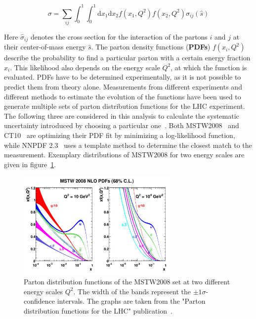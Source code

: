 \begin{equation}
  \label{eq:pdfxs}
  \sigma = \sum_{ij} \int_0^1 \int_0^1 \text{d}x_1 \text{d}x_2 f(x_1, Q^2) f(x_2 ,Q^2) \hat{\sigma}_{ij}(\hat{s})
\end{equation}

Here $\hat{\sigma}_{ij}$ denotes the cross section for the interaction of the partons $i$ and $j$ at their center-of-mass energy $\hat{s}$. The parton density functions (\textbf{PDFs}) $f(x_i, Q^2)$ describe the probability to find a particular parton with a certain energy fraction $x_i$. This likelihood also depends on the energy scale $Q^2$, at which the function is evaluated. PDFs have to be determined experimentally, as it is not possible to predict them from theory alone. Measurements from different experiments and different methods to estimate the evolution of the functions have been used to generate multiple sets of parton distribution functions for the LHC experiment. The following three are considered in this analysis to calculate the systematic uncertainty introduced by choosing a particular one~\cite{pdfforlhc}. Both \textsc{MSTW2008}~\cite{mstw2008,mstw2008as} and \textsc{CT10}~\cite{ct10} are optimizing their PDF fit by minimizing a log-likelihood function, while \textsc{NNPDF 2.3}~\cite{nnpdf23,nnpdf23as} uses a template method to determine the closest match to the measurement. Exemplary distributions of \textsc{MSTW2008} for two energy scales are given in figure~\ref{fig:mstw2008pdf}.

\begin{figure}[htb!]
  \centering
  \includegraphics[width=0.7\textwidth]{plots/mstw2008pdf.pdf}
  \caption{Parton distribution functions of the MSTW2008 set at two different energy scales $Q^2$. The width of the bands represent the $\pm 1 \sigma$-confidence intervals. The graphs are taken from the "Parton distribution functions for the LHC" publication~\cite{pdfforlhc}.}
  \label{fig:mstw2008pdf}
\end{figure}

